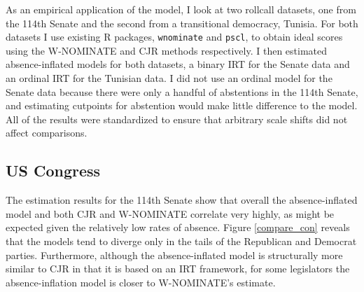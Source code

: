 	As an empirical application of the model, I look at two rollcall datasets, one from the 114th Senate and the second from a transitional democracy, Tunisia. For both datasets I use existing R packages, \texttt{wnominate} and \texttt{pscl}, to obtain ideal scores using the W-NOMINATE and CJR methods respectively. I then estimated absence-inflated models for both datasets, a binary IRT for the Senate data and an ordinal IRT for the Tunisian data. I did not use an ordinal model for the Senate data because there were only a handful of abstentions in the 114th Senate, and estimating cutpoints for abstention would make little difference to the model. All of the results were standardized to ensure that arbitrary scale shifts did not affect comparisons.
	
	\subsection*{US Congress}
	
	The estimation results for the 114th Senate show that overall the absence-inflated model and both CJR and W-NOMINATE correlate very highly, as might be expected given the relatively low rates of absence. Figure \ref{compare_con} reveals that the models tend to diverge only in the tails of the Republican and Democrat parties. Furthermore, although the absence-inflated model is structurally more similar to CJR in that it is based on an IRT framework, for some legislators the absence-inflation model is closer to W-NOMINATE's estimate. 
	
